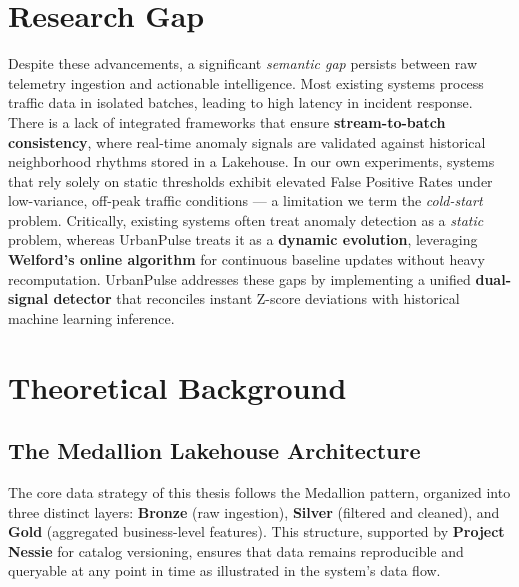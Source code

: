 \section{Research Gap}
Despite these advancements, a significant \textit{semantic gap} persists between raw telemetry ingestion and actionable intelligence. Most existing systems process traffic data in isolated batches, leading to high latency in incident response. There is a lack of integrated frameworks that ensure \textbf{stream-to-batch consistency}, where real-time anomaly signals are validated against historical neighborhood rhythms stored in a Lakehouse. In our own experiments, systems that rely solely on static thresholds exhibit elevated False Positive Rates under low-variance, off-peak traffic conditions — a limitation we term the \textit{cold-start} problem. Critically, existing systems often treat anomaly detection as a \textit{static} problem, whereas UrbanPulse treats it as a \textbf{dynamic evolution}, leveraging \textbf{Welford's online algorithm} for continuous baseline updates without heavy recomputation. UrbanPulse addresses these gaps by implementing a unified \textbf{dual-signal detector} that reconciles instant Z-score deviations with historical machine learning inference.

\section{Theoretical Background}
\subsection{The Medallion Lakehouse Architecture}
The core data strategy of this thesis follows the Medallion pattern, organized into three distinct layers: \textbf{Bronze} (raw ingestion), \textbf{Silver} (filtered and cleaned), and \textbf{Gold} (aggregated business-level features). This structure, supported by \textbf{Project Nessie} for catalog versioning, ensures that data remains reproducible and queryable at any point in time as illustrated in the system's data flow.

